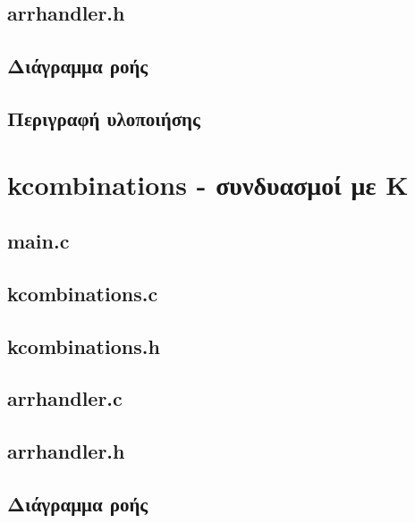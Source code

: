 \documentclass{article}
\begin{document}
    \subsection{arrhandler.h}
        

    \subsection{Διάγραμμα ροής}

    \subsection{Περιγραφή υλοποιήσης}


\section{kcombinations - συνδυασμοί με K}

    \subsection{main.c}
        

    \subsection{kcombinations.c}
        

    \subsection{kcombinations.h}
        

    \subsection{arrhandler.c}
        

    \subsection{arrhandler.h}
         

    \subsection{Διάγραμμα ροής}
\end{document}
